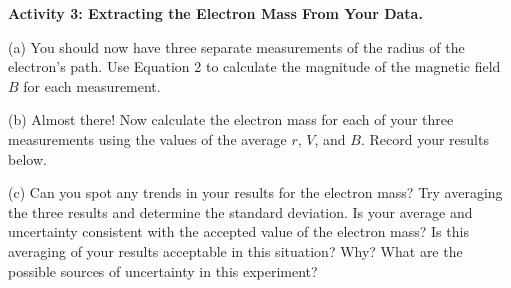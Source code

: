 \newpage

\textbf{Activity 3: Extracting the Electron Mass From Your Data.}

(a) You should now have three separate measurements of the radius of the electron's path.
Use Equation 2 to calculate the magnitude of the magnetic field $B$
for each measurement.
\vspace{30mm}

(b) Almost there! Now calculate the electron mass for each of your three measurements using
the values of the average $r$, $V$, and $B$. 
Record your results below.
\vspace{50mm}

(c) Can you spot any trends in your results for the electron mass?
Try averaging the three results and determine the standard deviation.
Is your average and uncertainty consistent with the accepted value of the electron mass?
Is this averaging of your results acceptable in this situation?
Why?
What are the possible sources of uncertainty in this experiment?




